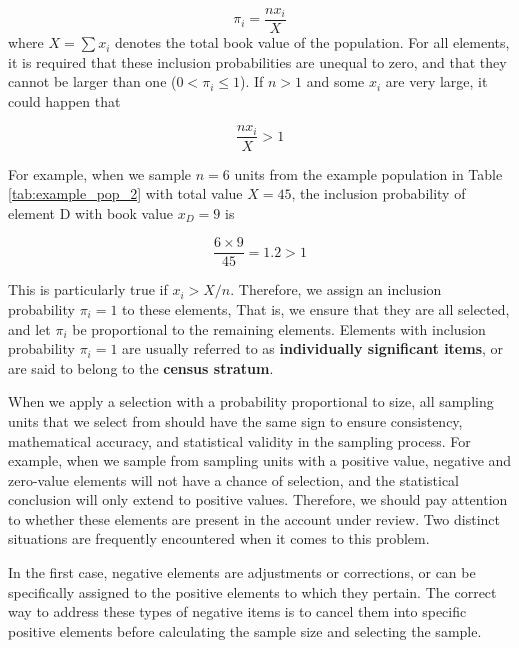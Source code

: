 \documentclass[12pt,a4paper]{memoir}
\begin{document}
\begin{equation}
\pi _i = \frac{n x_i}{X}
\label{eq:inclusion_probability}
\end{equation}
where $X = \sum{x_i}$ denotes the total book value of the population. For all elements, it is required that these inclusion probabilities are unequal to zero, and that they cannot be larger than one ($0 < \pi_i \leq 1$). If $n > 1$ and some $x_i$ are very large, it could happen that

\begin{equation*}
\frac{n x_i}{X} > 1
\end{equation*}

For example, when we sample $n = 6$ units from the example population in Table \ref{tab:example_pop_2} with total value $X = 45$, the inclusion probability of element D with book value $x_D = 9$ is

\begin{equation*}
\frac{6 \times 9}{45} = 1.2 > 1
\end{equation*}

This is particularly true if $x_i > {X} / {n}$.
Therefore, we assign an inclusion probability $\pi_i = 1$ to these elements, That is, we ensure that they are all selected, and let $\pi_i$ be proportional to the remaining elements. Elements with inclusion probability $\pi_i = 1$ are usually referred to as \textbf{individually significant items}, or are said to belong to the \textbf{census stratum}.

\bigskip
When we apply a selection with a probability proportional to size, all sampling units that we select from should have the same sign to ensure consistency, mathematical accuracy, and statistical validity in the sampling process. For example, when we sample from sampling units with a positive value, negative and zero-value elements will not have a chance of selection, and the statistical conclusion will only extend to positive values. Therefore, we should pay attention to whether these elements are present in the account under review. Two distinct situations are frequently encountered when it comes to this problem. 

In the first case, negative elements are adjustments or corrections, or can be specifically assigned to the positive elements to which they pertain. The correct way to address these types of negative items is to cancel them into specific positive elements before calculating the sample size and selecting the sample. 
\end{document}
